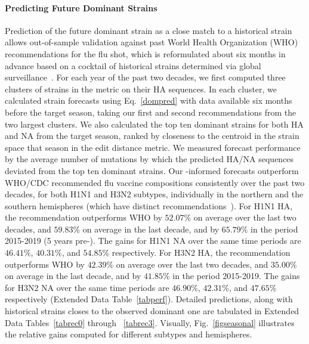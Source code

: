 \documentclass[onecolumn, compsoc,12pt]{IEEEtran}
\def\EXTENDED{Extended Data\xspace}
\begin{document}
\paragraph*{Predicting Future Dominant Strains}
Prediction of the future dominant strain as  a close match to a historical strain  allows out-of-sample validation against past World Health Organization (WHO) recommendations for the flu shot, which  is  reformulated about six months in advance based on a  cocktail of historical strains determined via global surveillance~\cite{agor2018models}. For each year of the past two decades, we first computed three clusters of strains in the \qdist metric on their HA sequences. In each cluster, we calculated strain forecasts using  Eq.~\eqref{dompred} with data available six months before the target season, taking our first and second recommendations from the two largest clusters. We also calculated the top ten dominant strains for both HA and NA from the target season, ranked by closeness to the centroid in the strain space that season in the edit distance metric. We  measured forecast performance by the average number of mutations by which the predicted HA/NA sequences deviated from the top ten dominant strains. Our \enet-informed forecasts outperform  WHO/CDC recommended flu vaccine compositions consistently over the past two decades, for both H1N1 and H3N2 subtypes, individually in the northern and the southern hemispheres (which have distinct recommendations~\cite{boni2008vaccination}). For H1N1 HA, the \enet  recommendation outperforms  WHO  by $52.07\%$ on average over the last two decades, and $59.83\%$ on average in the last decade, and by $65.79\%$ in the period 2015-2019 (5 years pre-\cov). The gains for H1N1 NA over the same time periods are $46.41\%$, $40.31\%$, and $54.85\%$ respectively. For H3N2 HA, the \enet  recommendation outperforms  WHO  by $42.39\%$ on average over the last two decades, and $35.00\%$ on average in the last decade, and by $41.85\%$ in the period 2015-2019. The gains for H3N2 NA over the same time periods are $46.90\%$, $42.31\%$, and $47.65\%$ respectively (\EXTENDED Table~\ref{tabperf}). Detailed predictions, along with historical strains closes to the observed dominant one are tabulated in \EXTENDED Tables~\ref{tabrec0} through ~\ref{tabrec3}. Visually, Fig.~\ref{figseasonal} illustrates the relative gains computed for different subtypes and hemispheres.
\end{document}
